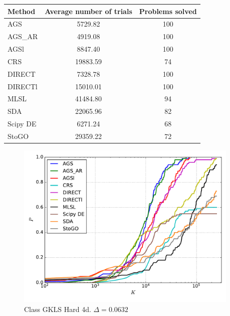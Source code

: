 \documentclass[a4paper]{article}
\begin{document}
\begin{tabular}{lcc}
\hline
 Method   &  Average number of trials  &  Problems solved  \\
\hline
 AGS      &          5729.82           &        100        \\
 AGS\_AR   &          4919.08           &        100        \\
 AGSl     &          8847.40           &        100        \\
 CRS      &          19883.59          &        74         \\
 DIRECT   &          7328.78           &        100        \\
 DIRECTl  &          15010.01          &        100        \\
 MLSL     &          41484.80          &        94         \\
 SDA      &          22065.96          &        82         \\
 Scipy DE &          6271.24           &        68         \\
 StoGO    &          29359.22          &        72         \\
\hline
\end{tabular}
\begin{figure}[H]
  \center
  \includegraphics[width=0.95\textwidth]{../experiments/gklsh4d_serg/cmc.pdf}
  \caption{Class GKLS Hard 4d. $\Delta=0.0632$}

\end{figure}
\end{document}
